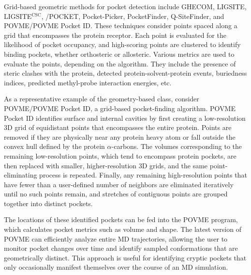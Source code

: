 \par Grid-based geometric methods for pocket detection include GHECOM,\cite{Kawabata2010a} LIGSITE,\cite{Hendlich1997a} LIGSITE$^{\textrm{CSC}}$,\cite{Huang2006a} /POCKET,\cite{Levitt1992a} Pocket-Picker,\cite{Weisel2007a} PocketFinder,\cite{An2005a} Q-SiteFinder,\cite{Laurie2005a} and POVME/POVME Pocket ID.\cite{Durrant2014a,Durrant2011} These techniques consider points spaced along a grid that encompasses the protein receptor. Each point is evaluated for the likelihood of pocket occupancy, and high-scoring points are clustered to identify binding pockets, whether orthosteric or allosteric. Various metrics are used to evaluate the points, depending on the algorithm. They include the presence of steric clashes with the protein, detected protein-solvent-protein events,\cite{Levitt1992a,Hendlich1997a} buriedness indices,\cite{Weisel2007a} predicted methyl-probe interaction energies,\cite{Laurie2005a,An2005a} etc.
\par As a representative example of the geometry-based class, consider POVME/POVME Pocket ID, a grid-based pocket-finding algorithm.\cite{Durrant2014a,Durrant2011} POVME Pocket ID identifies surface and internal cavities by first creating a low-resolution 3D grid of equidistant points that encompasses the entire protein. Points are removed if they are physically near any protein heavy atom or fall outside the convex hull defined by the protein $\alpha$-carbons. The volumes corresponding to the remaining low-resolution points, which tend to encompass protein pockets, are then replaced with smaller, higher-resolution 3D grids, and the same point-eliminating process is repeated. Finally, any remaining high-resolution points that have fewer than a user-defined number of neighbors are eliminated iteratively until no such points remain, and stretches of contiguous points are grouped together into distinct pockets.
\par The locations of these identified pockets can be fed into the POVME program, which calculates pocket metrics such as volume and shape. The latest version of POVME can efficiently analyze entire MD trajectories, allowing the user to monitor pocket changes over time and identify sampled conformations that are geometrically distinct. This approach is useful for identifying cryptic pockets that only occasionally manifest themselves over the course of an MD simulation.
